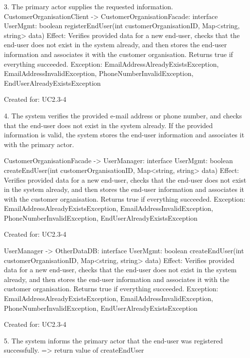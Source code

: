         3. The primary actor supplies the requested information.
            CustomerOrganisationClient -> CustomerOrganisationFacade: interface UserMgmt: boolean registerEndUser(int customerOrganisationID, Map<string, string> data)
                Effect: Verifies provided data for a new end-user, checks that the end-user does not exist in the system already, and then stores the end-user information
                        and associates it with the customer organisation. Returns true if everything succeeded.
                Exception: EmailAddressAlreadyExistsException, EmailAddressInvalidException, PhoneNumberInvalidException, EndUserAlreadyExistsException
                \item Created for: UC2.3-4

        4. The system verifies the provided e-mail address or phone number, and checks that the end-user
            does not exist in the system already. If the provided information is valid, the system stores
            the end-user information and associates it with the primary actor.

            CustomerOrganisationFacade -> UserManager: interface UserMgmt: boolean createEndUser(int customerOrganisationID, Map<string, string> data)
                Effect: Verifies provided data for a new end-user, checks that the end-user does not exist in the system already, and then stores the end-user information
                        and associates it with the customer organisation. Returns true if everything succeeded.
                Exception: EmailAddressAlreadyExistsException, EmailAddressInvalidException, PhoneNumberInvalidException, EndUserAlreadyExistsException
                \item Created for: UC2.3-4

            UserManager -> OtherDataDB: interface UserMgmt: boolean createEndUser(int customerOrganisationID, Map<string, string> data)
                Effect: Verifies provided data for a new end-user, checks that the end-user does not exist in the system already, and then stores the end-user information
                        and associates it with the customer organisation. Returns true if everything succeeded.
                Exception: EmailAddressAlreadyExistsException, EmailAddressInvalidException, PhoneNumberInvalidException, EndUserAlreadyExistsException
                \item Created for: UC2.3-4

        5. The system informs the primary actor that the end-user was registered successfully.
            => return value of createEndUser


